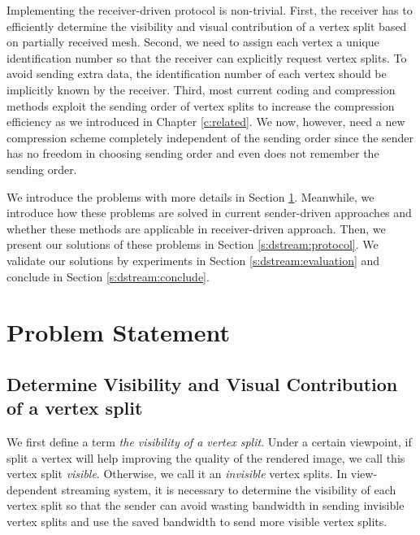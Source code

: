     Implementing the receiver-driven protocol is non-trivial. 
    First, the receiver has to efficiently determine the visibility and visual contribution
    of a vertex split based on partially received mesh. 
    Second, we need to assign each vertex a unique identification number
    so that the receiver can explicitly request vertex splits. 
    To avoid sending extra data, the identification number of each vertex 
    should be implicitly known by the receiver.
    Third, most current coding and compression methods exploit the sending order of vertex splits
    to increase the compression efficiency as we introduced in Chapter \ref{c:related}.
    We now, however, need a new compression scheme
    completely independent of the sending order since the sender has no freedom in choosing sending order
    and even does not remember the sending order.

    We introduce the problems with more details in Section \ref{s:dstream:terms}. 
    Meanwhile, we introduce how these problems are solved in current sender-driven approaches and 
    whether these methods are applicable in receiver-driven approach.
    Then, we present our solutions of these problems in Section \ref{s:dstream:protocol}.
    We validate our solutions by experiments in Section \ref{s:dstream:evaluation} 
    and conclude in Section \ref{s:dstream:conclude}.

\section{Problem Statement}
\label{s:dstream:terms}
    \subsection{Determine Visibility and Visual Contribution of a vertex split}
    We first define a term \emph{the visibility of a vertex split}. Under a certain
    viewpoint, if split a vertex will help improving the quality of the rendered image,
    we call this vertex split \emph{visible}. Otherwise, we call it an \emph{invisible}
    vertex splits.
    In view-dependent streaming system, it is necessary to determine the visibility
    of each vertex split so that the sender can avoid wasting bandwidth in sending invisible 
    vertex splits and use the saved bandwidth to send more visible vertex splits.

